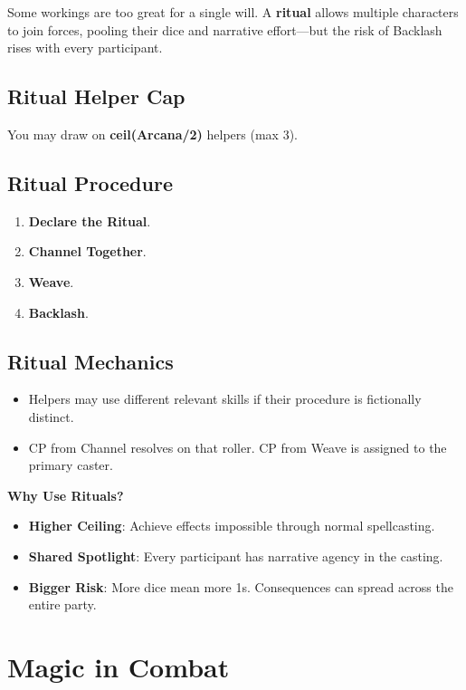 Some workings are too great for a single will. A \textbf{ritual} allows multiple characters to join forces, pooling their dice and narrative effort—but the risk of Backlash rises with every participant.

\subsection*{Ritual Helper Cap}

You may draw on \textbf{ceil(Arcana/2)} helpers (max 3).

\subsection*{Ritual Procedure}

\begin{enumerate}
    \item \textbf{Declare the Ritual}.
    \item \textbf{Channel Together}.
    \item \textbf{Weave}.
    \item \textbf{Backlash}.
\end{enumerate}

\subsection*{Ritual Mechanics}

\begin{itemize}
    \item Helpers may use different relevant skills if their procedure is fictionally distinct.
    \item CP from Channel resolves on that roller. CP from Weave is assigned to the primary caster.
\end{itemize}

\textbf{Why Use Rituals?}

\begin{itemize}
    \item \textbf{Higher Ceiling}: Achieve effects impossible through normal spellcasting.
    \item \textbf{Shared Spotlight}: Every participant has narrative agency in the casting.
    \item \textbf{Bigger Risk}: More dice mean more 1s. Consequences can spread across the entire party.
\end{itemize}

\section*{Magic in Combat}

